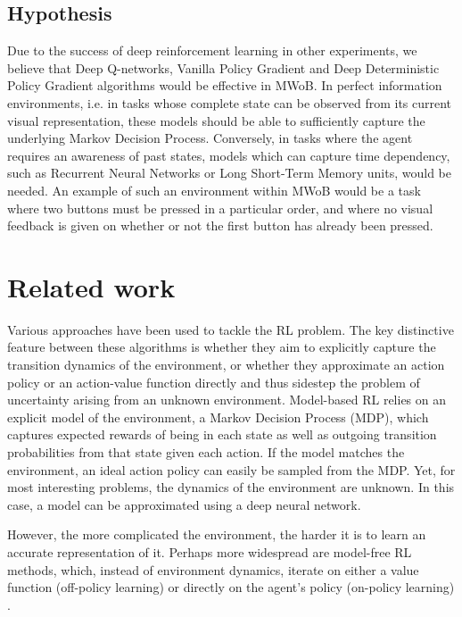 \documentclass[10pt,journal,compsoc]{IEEEtran}
\begin{document}
\subsection{Hypothesis}
Due to the success of deep reinforcement learning in other experiments, we believe that Deep Q-networks, Vanilla Policy Gradient and Deep Deterministic Policy Gradient algorithms would be effective in MWoB. In perfect information environments, i.e. in tasks whose complete state can be observed from its current visual representation, these models should be able to sufficiently capture the underlying Markov Decision Process. Conversely, in tasks where the agent requires an awareness of past states, models which can capture time dependency, such as Recurrent Neural Networks or Long Short-Term Memory units, would be needed. An example of such an environment within MWoB would be a task where two buttons must be pressed in a particular order, and where no visual feedback is given on whether or not the first button has already been pressed.

\section{Related work}
Various approaches have been used to tackle the RL problem.
The key distinctive feature between these algorithms is whether they aim to explicitly capture the transition dynamics of the environment, or whether they approximate an action policy or an action-value function directly and thus sidestep the problem of uncertainty arising from an unknown environment.
Model-based RL relies on an explicit model of the environment, a Markov Decision Process (MDP), which captures expected rewards of being in each state as well as outgoing transition probabilities from that state given each action. If the model matches the environment, an ideal action policy can easily be sampled from the MDP. Yet, for most interesting problems, the dynamics of the environment are unknown. In this case, a model can be approximated using a deep neural network.

However, the more complicated the environment, the harder it is to learn an accurate representation of it. Perhaps more widespread are model-free RL methods, which, instead of environment dynamics, iterate on either a value function (off-policy learning) \cite{watkins1989learning} or directly on the agent's policy (on-policy learning) \cite{sutton1999policy}.
\end{document}
